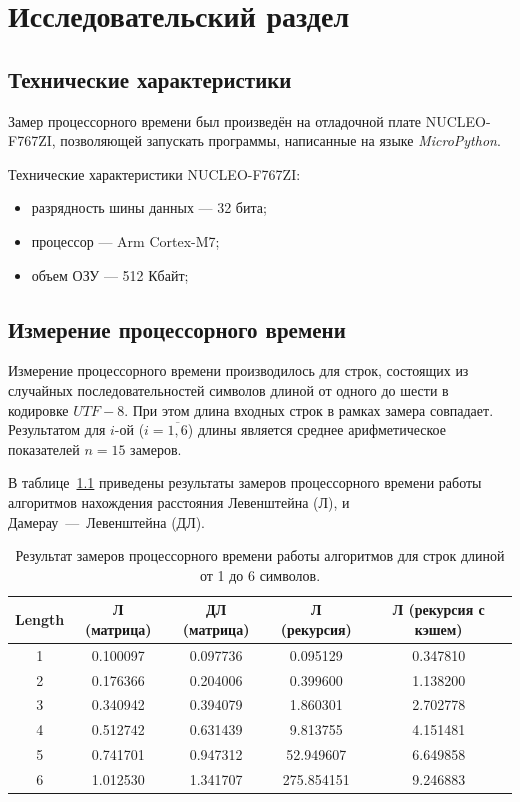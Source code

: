 \chapter{Исследовательский раздел}
\section{Технические характеристики}

Замер процессорного времени был произведён на отладочной плате NUCLEO-F767ZI\cite{stm}, позволяющей запускать программы, написанные на языке \textit{MicroPython}\cite{python}.

Технические характеристики NUCLEO-F767ZI:
\begin{itemize}[label=--]
    \item разрядность шины данных --- 32 бита;
    \item процессор --- Arm Cortex-M7;
    \item объем ОЗУ --- 512 Кбайт;
\end{itemize}

\section{Измерение процессорного времени}

Измерение процессорного времени производилось для строк, состоящих из случайных последовательностей символов длиной от одного до шести в кодировке $UTF-8$. При этом длина входных строк в рамках замера совпадает. Результатом для $i$-ой ($i=\overline{1,6}$) длины является среднее арифметическое показателей $n=15$ замеров. 

В таблице~\ref{table:timings} приведены результаты замеров процессорного времени работы алгоритмов нахождения расстояния Левенштейна (Л), и Дамерау~---~Левенштейна (ДЛ).

\begin{table}[htb]
\caption{\centering Результат замеров процессорного времени работы алгоритмов для строк длиной от 1 до 6 символов.}
\small
\centering\begin{tabular}{|c|c|c|c|c|}
    \hline
    \textbf{Length} & \textbf{Л (матрица)} & \textbf{ДЛ (матрица)} & \textbf{Л (рекурсия)} & \textbf{Л (рекурсия с кэшем)} \\
    \hline
    1 & 0.100097 & 0.097736 & 0.095129 & 0.347810 \\
    2 & 0.176366 & 0.204006 & 0.399600 & 1.138200 \\
    3 & 0.340942 & 0.394079 & 1.860301 & 2.702778 \\
    4 & 0.512742 & 0.631439 & 9.813755 & 4.151481 \\
    5 & 0.741701 & 0.947312 & 52.949607 & 6.649858 \\
    6 & 1.012530 & 1.341707 & 275.854151 & 9.246883 \\
    \hline
\end{tabular}
\label{table:timings}
\end{table}

